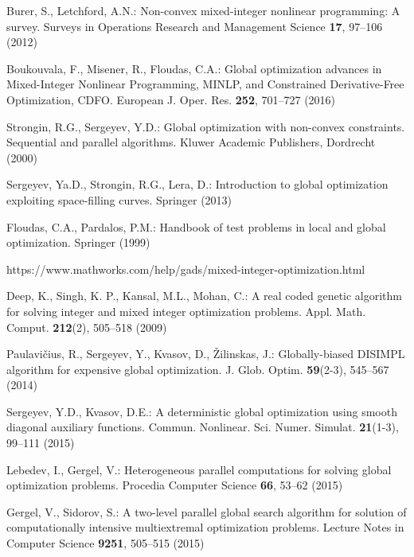 \documentclass{llncs}
\begin{document}
\begin{thebibliography}{10}

Burer, S., Letchford, A.N.: Non-convex mixed-integer nonlinear programming: A survey. Surveys in Operations Research and Management Science \textbf{17}, 97--106 (2012) 

Boukouvala, F., Misener, R., Floudas, C.A.: Global optimization advances in Mixed-Integer Nonlinear Programming, MINLP, and Constrained Derivative-Free Optimization, CDFO. European J. Oper. Res. \textbf{252}, 701--727 (2016) 

Strongin, R.G., Sergeyev, Y.D.: Global optimization with non-convex constraints. Sequential and parallel algorithms. Kluwer Academic Publishers, Dordrecht (2000) %

Sergeyev, Ya.D., Strongin, R.G., Lera, D.: Introduction to global optimization exploiting space-filling curves. Springer (2013) %

Floudas, C.A., Pardalos, P.M.:  Handbook of test problems in local and global optimization. Springer (1999)  %

https://www.mathworks.com/help/gads/mixed-integer-optimization.html

Deep, K., Singh, K. P., Kansal, M.L., Mohan, C.: A real coded genetic algorithm for solving integer and mixed integer optimization problems. Appl. Math. Comput. \textbf{212}(2), 505--518 (2009)


Paulavi\v{c}ius, R., Sergeyev, Y., Kvasov, D., \v{Z}ilinskas, J.: Globally-biased DISIMPL algorithm for expensive global optimization. J. Glob. Optim. \textbf{59}(2-3), 545--567 (2014)

Sergeyev, Y.D., Kvasov, D.E.: A deterministic global optimization using smooth diagonal auxiliary functions. Commun. Nonlinear. Sci. Numer. Simulat. \textbf{21}(1-3), 99--111 (2015)

Lebedev, I., Gergel, V.: Heterogeneous parallel computations for solving global optimization problems. Procedia Computer Science \textbf{66}, 53--62 (2015)

Gergel, V., Sidorov, S.: A two-level parallel global search algorithm for solution of computationally intensive multiextremal optimization problems. Lecture Notes in Computer Science  \textbf{9251}, 505--515 (2015)


\end{thebibliography}
\end{document}
